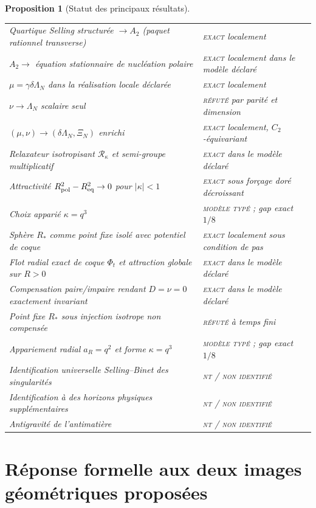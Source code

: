 \documentclass[11pt,a4paper]{article}
\newtheorem{proposition}[theorem]{Proposition}
\newcommand{\statusExact}{\textsc{exact}}
\newcommand{\statusTyped}{\textsc{modèle typé}}
\newcommand{\statusNT}{\textsc{nt / non identifié}}
\begin{document}
\begin{proposition}[Statut des principaux résultats]
\begin{center}
\begin{tabularx}{\textwidth}{@{}>{\raggedright\arraybackslash}X l@{}}
Quartique Selling structurée $\to A_2$ (paquet rationnel transverse) & \statusExact{} localement\\
$A_2\to$ équation stationnaire de nucléation polaire & \statusExact{} localement dans le modèle déclaré\\
$\mu=\gamma\delta\Lambda_N$ dans la réalisation locale déclarée & \statusExact{} localement\\
$\nu\to\Lambda_N$ scalaire seul & \textsc{réfuté} par parité et dimension\\
$(\mu,\nu)\to(\delta\Lambda_N,\Xi_N)$ enrichi & \statusExact{} localement, $C_2$-équivariant\\
Relaxateur isotropisant $\mathcal R_\kappa$ et semi-groupe multiplicatif & \statusExact{} dans le modèle déclaré\\
Attractivité $R_{\rm pol}^2-R_{\rm eq}^2\to0$ pour $|\kappa|<1$ & \statusExact{} sous forçage doré décroissant\\
Choix apparié $\kappa=q^3$ & \statusTyped{} ; gap exact $1/8$\\
Sphère $R_*$ comme point fixe isolé avec potentiel de coque & \statusExact{} localement sous condition de pas\\
Flot radial exact de coque $\Phi_t$ et attraction globale sur $R>0$ & \statusExact{} dans le modèle déclaré\\
Compensation paire/impaire rendant $D=\nu=0$ exactement invariant & \statusExact{} dans le modèle déclaré\\
Point fixe $R_*$ sous injection isotrope non compensée & \textsc{réfuté} à temps fini\\
Appariement radial $a_R=q^2$ et forme $\kappa=q^3$ & \statusTyped{} ; gap exact $1/8$\\
Identification universelle Selling--Binet des singularités & \statusNT\\
Identification à des horizons physiques supplémentaires & \statusNT\\
Antigravité de l'antimatière & \statusNT\\
\bottomrule
\end{tabularx}
\end{center}
\end{proposition}

\section{Réponse formelle aux deux images géométriques proposées}
\end{document}
